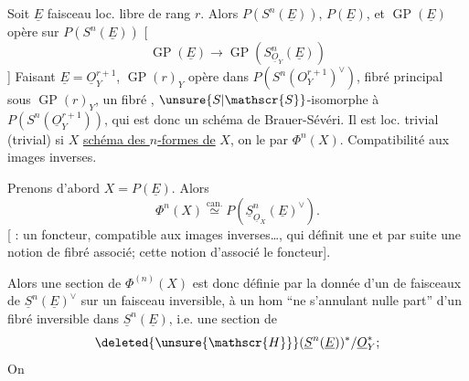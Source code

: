 Soit $\underline{E}$ faisceau loc. libre de rang $r$. Alors  $P(S^n(\underline{E}))$,   $P(\underline{E})$,  et $\operatorname{GP}(\underline{E})$ opère sur $P(S^n(\underline{E}))$   [
\[
\operatorname{GP}(\underline{E})\longrightarrow\operatorname{GP}(S^n_{\underline{O}_{Y}}(\underline{E}))
\]
] Faisant $\underline{E}=\underline{O}_{Y}^{r+1}$,  $\operatorname{GP}(r)_{Y}$ opère dans $P(S^n(O_{Y}^{r+1})^{\vee})$,   fibré principal  sous $\operatorname{GP}(r)_{Y}$,  un fibré  , $\unsure{S|\mathscr{S}}$-isomorphe à $P(S^n(\underline{O}_{Y}^{r+1}))$, qui est donc un schéma de Brauer-Sévéri. Il est loc. trivial (trivial) si $X$   \uline{schéma des $n$-formes de} $X$, on le  par $\Phi^n(X)$. Compatibilité aux images inverses.

Prenons d'abord $X=P(\underline{E})$. Alors
\[
\Phi^n(X)\overset{\text{can.}}{\simeq}P(\underline{S}^{n}_{\underline{O}_{X}}(\underline{E})^{\vee}).
\]
[ :  un foncteur, compatible aux images inverses\ldots, qui définit une  et par suite une notion de fibré associé;  cette  notion d'associé  le foncteur].

 Alors une section de $\Phi^{(n)}(X)$ est donc définie par  la donnée d'un  de faisceaux de $\underline{S}^{n}(\underline{E})^{\vee}$ sur un  faisceau inversible,  à un hom ``ne s'annulant nulle part'' d'un fibré inversible dans $\underline{S}^{n}(\underline{E})$, i.e. une section de
\[
\deleted{\unsure{\mathscr{H}}}(\underline{S}^{n}(\underline{E}))^{*}/\underline{O}_{Y}^{*};
\]
On 
